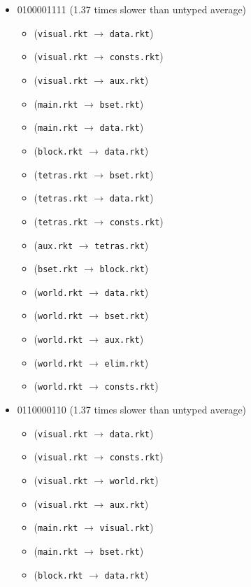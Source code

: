 \documentclass{article}
\newcommand{\mono}[1]{\texttt{#1}}
\begin{document}
\begin{itemize}
\begin{itemize}
  \end{itemize}
\item 0100001111 (1.37 times slower than untyped average)
  \begin{itemize}
  \item (\mono{visual.rkt} $\rightarrow$ \mono{data.rkt})
  \item (\mono{visual.rkt} $\rightarrow$ \mono{consts.rkt})
  \item (\mono{visual.rkt} $\rightarrow$ \mono{aux.rkt})
  \item (\mono{main.rkt} $\rightarrow$ \mono{bset.rkt})
  \item (\mono{main.rkt} $\rightarrow$ \mono{data.rkt})
  \item (\mono{block.rkt} $\rightarrow$ \mono{data.rkt})
  \item (\mono{tetras.rkt} $\rightarrow$ \mono{bset.rkt})
  \item (\mono{tetras.rkt} $\rightarrow$ \mono{data.rkt})
  \item (\mono{tetras.rkt} $\rightarrow$ \mono{consts.rkt})
  \item (\mono{aux.rkt} $\rightarrow$ \mono{tetras.rkt})
  \item (\mono{bset.rkt} $\rightarrow$ \mono{block.rkt})
  \item (\mono{world.rkt} $\rightarrow$ \mono{data.rkt})
  \item (\mono{world.rkt} $\rightarrow$ \mono{bset.rkt})
  \item (\mono{world.rkt} $\rightarrow$ \mono{aux.rkt})
  \item (\mono{world.rkt} $\rightarrow$ \mono{elim.rkt})
  \item (\mono{world.rkt} $\rightarrow$ \mono{consts.rkt})
  \end{itemize}
\item 0110000110 (1.37 times slower than untyped average)
  \begin{itemize}
  \item (\mono{visual.rkt} $\rightarrow$ \mono{data.rkt})
  \item (\mono{visual.rkt} $\rightarrow$ \mono{consts.rkt})
  \item (\mono{visual.rkt} $\rightarrow$ \mono{world.rkt})
  \item (\mono{visual.rkt} $\rightarrow$ \mono{aux.rkt})
  \item (\mono{main.rkt} $\rightarrow$ \mono{visual.rkt})
  \item (\mono{main.rkt} $\rightarrow$ \mono{bset.rkt})
  \item (\mono{block.rkt} $\rightarrow$ \mono{data.rkt})

\end{itemize}
\end{itemize}
\end{document}
